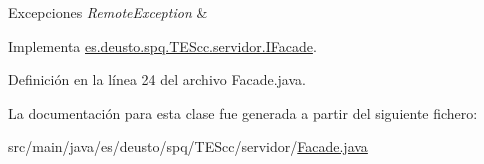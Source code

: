 \begin{DoxyExceptions}{Excepciones}
{\em Remote\+Exception} & \\
\hline
\end{DoxyExceptions}


Implementa \hyperlink{interfacees_1_1deusto_1_1spq_1_1_t_e_scc_1_1servidor_1_1_i_facade_ac638041330e66a5575c692620ff5e715}{es.\+deusto.\+spq.\+T\+E\+Scc.\+servidor.\+I\+Facade}.



Definición en la línea 24 del archivo Facade.\+java.



La documentación para esta clase fue generada a partir del siguiente fichero\+:\begin{DoxyCompactItemize}
\item 
src/main/java/es/deusto/spq/\+T\+E\+Scc/servidor/\hyperlink{_facade_8java}{Facade.\+java}\end{DoxyCompactItemize}
